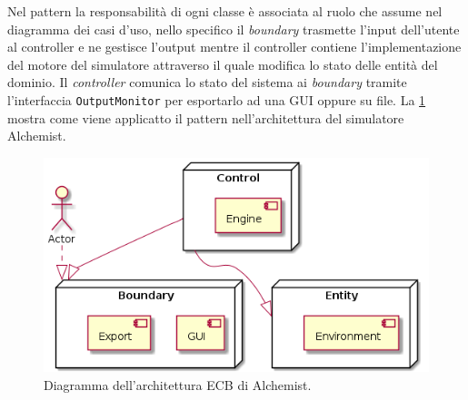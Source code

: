 \documentclass[12pt,a4paper,openright,oneside]{book}
\begin{document}
Nel pattern la responsabilità di ogni classe è associata al ruolo che assume nel diagramma dei casi d'uso, nello specifico il \textit{boundary} trasmette l'input dell'utente al controller e ne gestisce l'output mentre il controller contiene l'implementazione del motore del simulatore attraverso il quale modifica lo stato delle entità del dominio.
Il \textit{controller} comunica lo stato del sistema ai \textit{boundary} tramite l'interfaccia \texttt{OutputMonitor} per esportarlo ad una GUI oppure su file.
La \cref{fig:alchemist-ecb-arch} mostra come viene applicatto il pattern nell'architettura del simulatore Alchemist.
\begin{figure}
	\centering
	\includegraphics[width=1\linewidth]{images/alchemist-ecb.png}
	\caption{Diagramma dell'architettura ECB di Alchemist.}
	\label{fig:alchemist-ecb-arch}
\end{figure}
\end{document}
